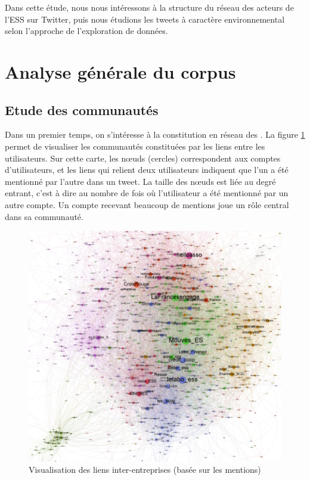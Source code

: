     Dans cette étude, nous nous intéressons à la structure du réseau des acteurs de l’ESS sur Twitter, puis nous étudions les tweets à caractère environnemental selon l’approche de l’exploration de données.

\section{Analyse générale du corpus}
    \subsection{Etude des communautés}

        Dans un premier temps, on s’intéresse à la constitution en réseau des \oess. La figure \ref{figure:reseaumentions} permet de visualiser les communautés constituées par les liens entre les utilisateurs. Sur cette carte, les nœuds (cercles) correspondent aux comptes d’utilisateurs, et les liens qui relient deux utilisateurs indiquent que l’un a été mentionné par l’autre dans un tweet. La taille des nœuds est liée au degré entrant, c’est à dire au nombre de fois où l’utilisateur a été mentionné par un autre compte. Un compte recevant beaucoup de mentions joue un rôle central dans sa communauté.

        \begin{figure}
            \caption{Visualisation des liens inter-entreprises (basée sur les mentions)}
            \label{figure:reseaumentions}
            \includegraphics[width = \linewidth]{fig/fig2.png}
        \end{figure}

